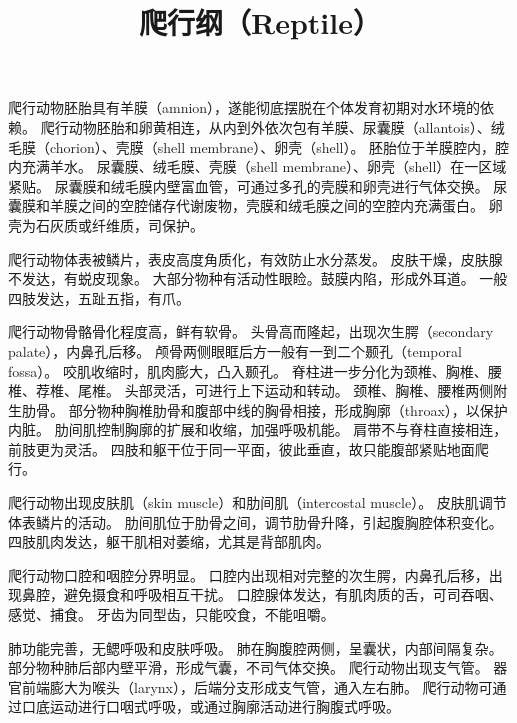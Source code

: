 \documentclass[11pt]{article}
\title{爬行纲（Reptile）}
\date{}
\begin{document}
  \maketitle

  \linenumbers
爬行动物胚胎具有羊膜（amnion），遂能彻底摆脱在个体发育初期对水环境的依赖。
爬行动物胚胎和卵黄相连，从内到外依次包有羊膜、尿囊膜（allantois）、绒毛膜（chorion）、壳膜（shell membrane）、卵壳（shell）。
胚胎位于羊膜腔内，腔内充满羊水。
尿囊膜、绒毛膜、壳膜（shell membrane）、卵壳（shell）在一区域紧贴。
尿囊膜和绒毛膜内壁富血管，可通过多孔的壳膜和卵壳进行气体交换。
尿囊膜和羊膜之间的空腔储存代谢废物，壳膜和绒毛膜之间的空腔内充满蛋白。
卵壳为石灰质或纤维质，司保护。

\newline

爬行动物体表被鳞片，表皮高度角质化，有效防止水分蒸发。
皮肤干燥，皮肤腺不发达，有蜕皮现象。
大部分物种有活动性眼睑。鼓膜内陷，形成外耳道。
一般四肢发达，五趾五指，有爪。

\newline

爬行动物骨骼骨化程度高，鲜有软骨。
头骨高而隆起，出现次生腭（secondary palate），内鼻孔后移。
颅骨两侧眼眶后方一般有一到二个颞孔（temporal fossa）。
咬肌收缩时，肌肉膨大，凸入颞孔。
脊柱进一步分化为颈椎、胸椎、腰椎、荐椎、尾椎。
头部灵活，可进行上下运动和转动。
颈椎、胸椎、腰椎两侧附生肋骨。
部分物种胸椎肋骨和腹部中线的胸骨相接，形成胸廓（throax），以保护内脏。
肋间肌控制胸廓的扩展和收缩，加强呼吸机能。
肩带不与脊柱直接相连，前肢更为灵活。
四肢和躯干位于同一平面，彼此垂直，故只能腹部紧贴地面爬行。

\newline

爬行动物出现皮肤肌（skin muscle）和肋间肌（intercostal muscle）。
皮肤肌调节体表鳞片的活动。
肋间肌位于肋骨之间，调节肋骨升降，引起腹胸腔体积变化。
四肢肌肉发达，躯干肌相对萎缩，尤其是背部肌肉。

\newline

爬行动物口腔和咽腔分界明显。
口腔内出现相对完整的次生腭，内鼻孔后移，出现鼻腔，避免摄食和呼吸相互干扰。
口腔腺体发达，有肌肉质的舌，可司吞咽、感觉、捕食。
牙齿为同型齿，只能咬食，不能咀嚼。

\newline

肺功能完善，无鳃呼吸和皮肤呼吸。
肺在胸腹腔两侧，呈囊状，内部间隔复杂。
部分物种肺后部内壁平滑，形成气囊，不司气体交换。
爬行动物出现支气管。
器官前端膨大为喉头（larynx），后端分支形成支气管，通入左右肺。
爬行动物可通过口底运动进行口咽式呼吸，或通过胸廓活动进行胸腹式呼吸。
\end{document}
